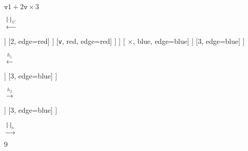 \documentclass{beamer}
\begin{document}
\begin{frame}
\begin{center}
      \fontsize{6}{7}      
      \begin{minipage}{0.1\linewidth}
        $\texttt{v} 1 + 2\texttt{v} \times 3$
      \end{minipage}
    $\xleftarrow{\llbracket \cdot \rrbracket_{\Sigma^{\ast}}}$
    \begin{minipage}{0.18\linewidth}
	      \centering
	      \begin{forest}
      	      [$\cdot$, blue [$\cdot$, blue, edge=blue [ $\cdot$, red, edge=blue [ \texttt{v}, red, edge=red ] [$\cdot$, red, edge=red [$\cdot$, red, edge=red [$\cdot$, red, edge=red [1, edge=red] [+, red, edge=red]] [2, edge=red] ] [\texttt{v}, red, edge=red] ]  ] [ $\times$, blue, edge=blue] ] [3, edge=blue] ]
           \end{forest}
      \end{minipage}
      $\xleftarrow{h_1}$      
	  \begin{minipage}{0.1\linewidth}
		  \centering
		  \begin{forest}
		    [$r_{m}$, blue [ $r_{a}$, red, edge=blue [$1$, edge=red] [$2$, edge=red] ] [$3$, edge=blue] ] 
		  \end{forest}
	  \end{minipage}
      $\xrightarrow{h_2}$
      \begin{minipage}{0.18\linewidth}
      	\centering
      	\begin{forest}
      		[\texttt{mul}, blue [ \texttt{add},red, edge=blue [$1$, edge=red] [$2$, edge=red] ]  [$3$, edge=blue] ]
      	\end{forest}
      \end{minipage}
      $\xrightarrow{\llbracket \cdot \rrbracket_{\mathbb{N}}}$
      \begin{minipage}{0.05\linewidth}
      	\centering
      	$9$
      \end{minipage}
    \end{center}
\end{frame}
\end{document}
